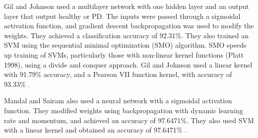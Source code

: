 \documentclass[draftcopy]{srpaper}
\begin{document}
Gil and Johnson used a multilayer network with one hidden layer
and an output layer that output healthy or PD. The inputs were passed
through a sigmoidal activation function, and gradient descent
backpropagation was used to modify the weights. They achieved a
classification accuracy of 92.31\%.
They also trained an SVM using the sequential minimal
optimization (SMO) algorithm. SMO speeds up training
of SVMs, particularly those with non-linear kernel functions (Platt
1998), using a divide and conquer approach. Gil and Johnson used a
linear kernel with 91.79\% accuracy, and a Pearson VII function
kernel, with accuracy of 93.33\% \cite{GJ70}.

Mandal and Sairam also used a neural network with a sigmoidal activation function. They modified weights using backpropagation with dynamic
learning rate and momentum, and achieved an accuracy of 97.6471\%.
They also used SVM with a linear kernel and obtained an
accuracy of 97.6471\% \cite{MS12}.



\end{document}

